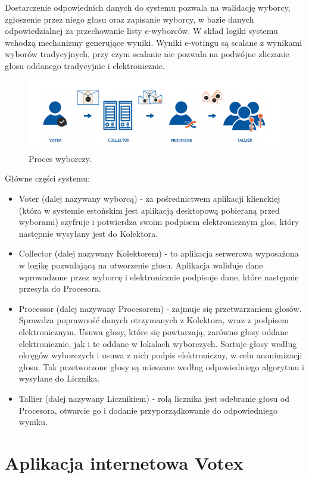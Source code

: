 \documentclass[a4paper,12pt]{book}
\begin{document}
Dostarczenie odpowiednich danych do systemu pozwala na walidację wyborcy, zgłoszenie przez
niego głosu oraz zapisanie wyborcy, w bazie danych odpowiedzialnej za przechowanie listy e-wyborców. W skład logiki systemu wchodzą mechanizmy generujące wyniki. Wyniki e-votingu są scalane z wynikami wyborów tradycyjnych, przy czym scalanie nie pozwala na podwójne zliczanie głosu oddanego tradycyjnie i elektronicznie.

\begin{figure}[h]
	\centering
	\includegraphics[width=\textwidth]{images/Główne częsci systemu estońskiego.png}
	\caption{Proces wyborczy.}
\end {figure}

Główne części systemu:
\begin{itemize}
\item Voter (dalej nazywany wyborcą) - za pośrednictwem aplikacji klienckiej (która w systemie estońskim jest aplikacją desktopową pobieraną przed wyborami) szyfruje i potwierdza swoim podpisem elektronicznym głos, który następnie wysyłany jest do Kolektora.
\item Collector (dalej nazywany Kolektorem) - to aplikacja serwerowa wyposażona w logikę pozwalającą na utworzenie głosu. Aplikacja waliduje dane wprowadzone przez wyborcę i elektronicznie podpisuje dane, które następnie przesyła do Procesora.
\item Processor (dalej nazywany Procesorem) - zajmuje się przetwarzaniem głosów. Sprawdza poprawność danych otrzymanych z Kolektora, wraz z podpisem elektronicznym. Usuwa głosy, które się powtarzają, zarówno głosy oddane elektronicznie, jak i te oddane w lokalach wyborczych. Sortuje głosy według okręgów wyborczych i usuwa z nich podpis elektroniczny, w celu anonimizacji głosu. Tak przetworzone głosy są mieszane według odpowiedniego algorytmu i wysyłane do Licznika.
\item Tallier (dalej nazywany Licznikiem) - rolą licznika jest odebranie głosu od Procesora, otwarcie go i dodanie przyporządkowanie do odpowiedniego wyniku.
\end{itemize}

\section{Aplikacja internetowa Votex}
\end{document}
